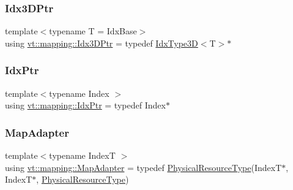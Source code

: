 \mbox{\label{namespacevt_1_1mapping_aacc737158b6517f2d760ffc8d1b5abca}} 
\subsubsection{\texorpdfstring{Idx3\+D\+Ptr}{Idx3DPtr}}
{\footnotesize\ttfamily template$<$typename T  = Idx\+Base$>$ \\
using \hyperlink{namespacevt_1_1mapping_aacc737158b6517f2d760ffc8d1b5abca}{vt\+::mapping\+::\+Idx3\+D\+Ptr} = typedef \hyperlink{namespacevt_a65e4a83c0567ecb7a54b78e9b8e7d7ab}{Idx\+Type3D}$<$T$>$$\ast$}

\mbox{\label{namespacevt_1_1mapping_a1bcab0d331bff853fe09c964d5e9cc8c}} 
\subsubsection{\texorpdfstring{Idx\+Ptr}{IdxPtr}}
{\footnotesize\ttfamily template$<$typename Index $>$ \\
using \hyperlink{namespacevt_1_1mapping_a1bcab0d331bff853fe09c964d5e9cc8c}{vt\+::mapping\+::\+Idx\+Ptr} = typedef Index$\ast$}

\mbox{\label{namespacevt_1_1mapping_a41b113c28bb6430fbcb5be66e08ccf9f}} 
\subsubsection{\texorpdfstring{Map\+Adapter}{MapAdapter}}
{\footnotesize\ttfamily template$<$typename IndexT $>$ \\
using \hyperlink{namespacevt_1_1mapping_a41b113c28bb6430fbcb5be66e08ccf9f}{vt\+::mapping\+::\+Map\+Adapter} = typedef \hyperlink{namespacevt_a2dc36fcada816dc6d11774d650328ee9}{Physical\+Resource\+Type}(IndexT$\ast$, IndexT$\ast$, \hyperlink{namespacevt_a2dc36fcada816dc6d11774d650328ee9}{Physical\+Resource\+Type})}

\mbox{\label{namespacevt_1_1mapping_add4b5257a62b56d194f7e931b608f8f0}} 
